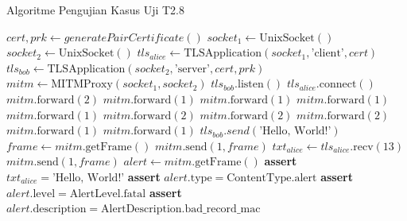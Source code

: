 \begin{algorithm}
  \caption{Algoritme Pengujian Kasus Uji T2.8}
  \label{alg:unit.test.t2.8}
  \begin{algorithmic}
    \State $cert, prk \gets generatePairCertificate()$
    \State $socket_1 \gets \text{UnixSocket}()$
    \State $socket_2 \gets \text{UnixSocket}()$
    \State $tls_{alice} \gets \text{TLSApplication}(socket_1, \text{'client'}, cert)$ 
    \State $tls_{bob} \gets \text{TLSApplication}(socket_2, \text{'server'}, cert, prk)$
    \State $mitm \gets \text{MITMProxy}(socket_1, socket_2)$
    \State
    \State $tls_{bob}.\text{listen}()$  
    \State $tls_{alice}.\text{connect}()$  
    \State
    \State $mitm.\text{forward}(2)$ 
    \State $mitm.\text{forward}(1)$ 
    \State $mitm.\text{forward}(1)$ 
    \State $mitm.\text{forward}(1)$ 
    \State $mitm.\text{forward}(1)$ 
    \State $mitm.\text{forward}(2)$ 
    \State $mitm.\text{forward}(2)$ 
    \State $mitm.\text{forward}(2)$ 
    \State $mitm.\text{forward}(1)$ 
    \State $mitm.\text{forward}(1)$ 
    \State
    \State $tls_{bob}.send(\text{'Hello, World!'})$
    \State $frame \gets mitm.\text{getFrame}()$
    \State $mitm.\text{send}(1, frame)$
    \State
    \State $txt_{alice} \gets tls_{alice}.\text{recv}(13)$
    \State $mitm.\text{send}(1, frame)$ 
    \State
    \State $alert \gets mitm.\text{getFrame}()$
    \State \textbf{assert} $txt_{alice} = \text{'Hello, World!'}$
    \State \textbf{assert} $alert.\text{type} = \text{ContentType.alert}$
    \State \textbf{assert} $alert.\text{level} = \text{AlertLevel.fatal}$
    \State \textbf{assert} $alert.\text{description} = \text{AlertDescription.bad\_record\_mac}$    
  \end{algorithmic}
\end{algorithm}

